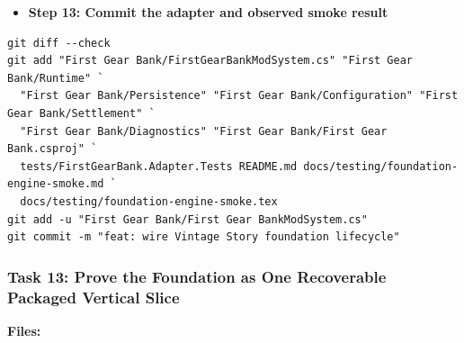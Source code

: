 \documentclass[
  10pt,
  letterpaper,
]{article}
\providecommand{\tightlist}{%
  \setlength{\itemsep}{0pt}\setlength{\parskip}{0pt}}
\begin{document}
\begin{itemize}
\tightlist
\item[$\square$]
  \textbf{Step 13: Commit the adapter and observed smoke result}
\end{itemize}

\begin{lstlisting}
git diff --check
git add "First Gear Bank/FirstGearBankModSystem.cs" "First Gear Bank/Runtime" `
  "First Gear Bank/Persistence" "First Gear Bank/Configuration" "First Gear Bank/Settlement" `
  "First Gear Bank/Diagnostics" "First Gear Bank/First Gear Bank.csproj" `
  tests/FirstGearBank.Adapter.Tests README.md docs/testing/foundation-engine-smoke.md `
  docs/testing/foundation-engine-smoke.tex
git add -u "First Gear Bank/First Gear BankModSystem.cs"
git commit -m "feat: wire Vintage Story foundation lifecycle"
\end{lstlisting}

\subsubsection{Task 13: Prove the Foundation as One Recoverable Packaged
Vertical
Slice}\label{task-13-prove-the-foundation-as-one-recoverable-packaged-vertical-slice}

\textbf{Files:}
\end{document}

